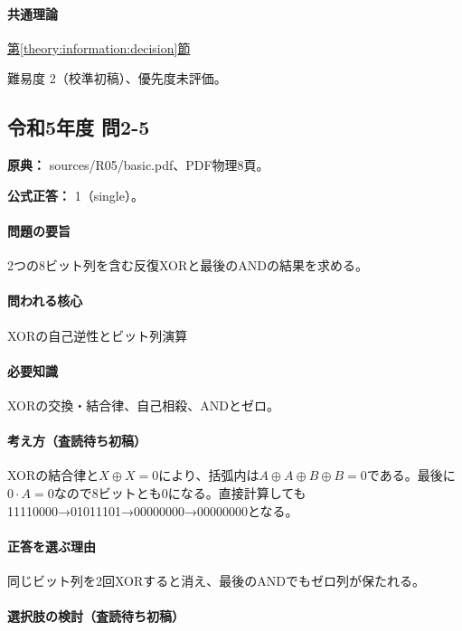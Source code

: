 \paragraph{共通理論} \hyperref[theory:information:decision]{第\ref*{theory:information:decision}節}

\par 難易度 2（校準初稿）、優先度未評価。

\subsection{令和5年度 問2-5}
\label{q:r05-reg-basic-2-5}

\noindent\textbf{原典：} sources/R05/basic.pdf、PDF物理8頁。

\textbf{公式正答：} 1（single）。

\paragraph{問題の要旨} 2つの8ビット列を含む反復XORと最後のANDの結果を求める。

\paragraph{問われる核心} XORの自己逆性とビット列演算

\paragraph{必要知識} XORの交換・結合律、自己相殺、ANDとゼロ。

\paragraph{考え方（査読待ち初稿）} XORの結合律と\(X\oplus X=0\)により、括弧内は\(A\oplus A\oplus B\oplus B=0\)である。最後に\(0\cdot A=0\)なので8ビットとも0になる。直接計算しても11110000→01011101→00000000→00000000となる。

\paragraph{正答を選ぶ理由} 同じビット列を2回XORすると消え、最後のANDでもゼロ列が保たれる。

\paragraph{選択肢の検討（査読待ち初稿）}\mbox{}\par

